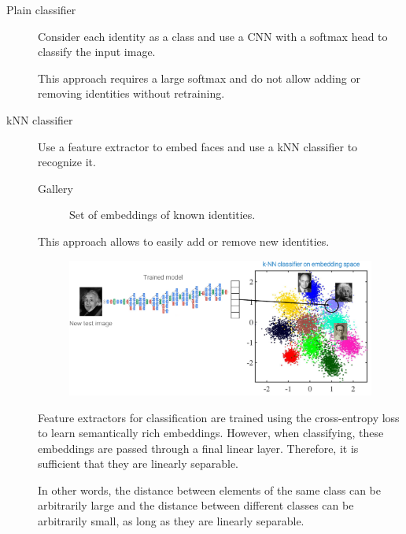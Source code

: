\begin{description}
    \item[Plain classifier] 
        Consider each identity as a class and use a CNN with a softmax head to classify the input image.

        \begin{remark}
            This approach requires a large softmax and do not allow adding or removing identities without retraining.
        \end{remark}

    \item[kNN classifier] 
        Use a feature extractor to embed faces and use a kNN classifier to recognize it.

        \begin{description}
            \item[Gallery] 
                Set of embeddings of known identities.
        \end{description}

        \begin{remark}
            This approach allows to easily add or remove new identities.
        \end{remark}

        \begin{figure}[H]
            \centering
            \includegraphics[width=0.7\linewidth]{./img/_cnn_knn_face_recognition.pdf}
        \end{figure}

        \begin{remark}
            Feature extractors for classification are trained using the cross-entropy loss to learn semantically rich embeddings. However, when classifying, these embeddings are passed through a final linear layer. Therefore, it is sufficient that they are linearly separable.

            In other words, the distance between elements of the same class can be arbitrarily large and the distance between different classes can be arbitrarily small, as long as they are linearly separable.


\end{remark}
\end{description}
